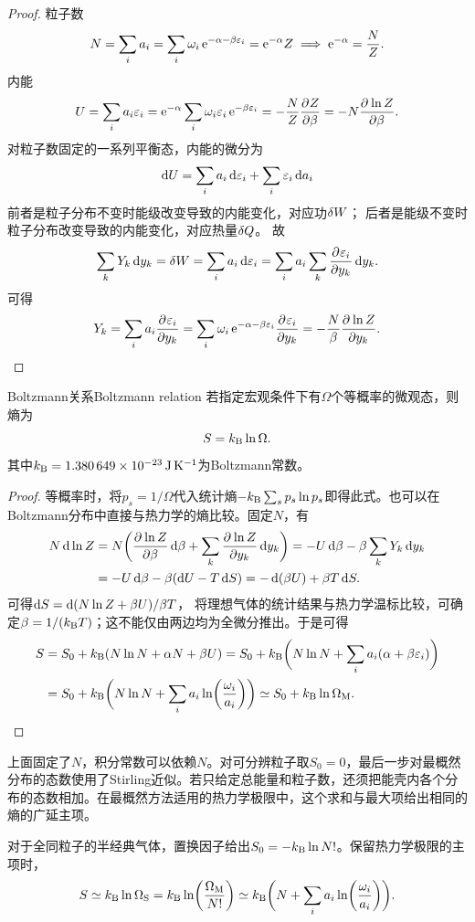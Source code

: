 \begin{proof}
	粒子数
	\[
		N = \sum_i a_i = \sum_i \omega_i\mathop{}\!\mathrm{e}^{-\alpha-\beta\varepsilon_i} = \mathop{}\!\mathrm{e}^{-\alpha}Z
		\implies \mathop{}\!\mathrm{e}^{-\alpha} = \frac NZ.
	\]
	内能
	\[
		U = \sum_i a_i\varepsilon_i = \mathop{}\!\mathrm{e}^{-\alpha}\sum_i \omega_i\varepsilon_i\mathop{}\!\mathrm{e}^{-\beta\varepsilon_i} = -\frac NZ\frac{\partial^{}Z}{\partial{\beta}^{}} = -N\frac{\partial^{}\ln Z}{\partial{\beta}^{}}.
	\]
	对粒子数固定的一系列平衡态，内能的微分为
	\[
		\mathop{}\!\mathrm{d} U = \sum_i a_i\mathop{}\!\mathrm{d}\varepsilon_i + \sum_i \varepsilon_i\mathop{}\!\mathrm{d} a_i
	\]
	前者是粒子分布不变时能级改变导致的内能变化，对应功$\mathop{}\!\delta W$；
	后者是能级不变时粒子分布改变导致的内能变化，对应热量$\mathop{}\!\delta Q$。
	故
	\[
		\sum_k Y_k\mathop{}\!\mathrm{d} y_k = \mathop{}\!\delta W = \sum_i a_i\mathop{}\!\mathrm{d}\varepsilon_i = \sum_i a_i\sum_k\frac{\partial^{}\varepsilon_i}{\partial{y_k}^{}}\mathop{}\!\mathrm{d} y_k.
	\]
	可得
	\[
		Y_k = \sum_i a_i\frac{\partial^{}\varepsilon_i}{\partial{y_k}^{}} = \sum_i \omega_i\mathop{}\!\mathrm{e}^{-\alpha-\beta\varepsilon_i}\frac{\partial^{}\varepsilon_i}{\partial{y_k}^{}} = -\frac N\beta\frac{\partial^{}\ln Z}{\partial{y_k}^{}}.
		\qedhere
	\]
\end{proof}

\begin{theorem}{Boltzmann关系}{Boltzmann relation}
	若指定宏观条件下有$\Omega$个等概率的微观态，则熵为
	\begin{equation}
		S = k_{\mathrm{B}}\ln\Omega.
	\end{equation}
	其中$k_{\mathrm{B}} = \qty{1.380649e-23}{\joule\per\kelvin}$为Boltzmann常数。
\end{theorem}

\begin{proof}
	等概率时，将$p_s = 1/\Omega$代入统计熵$\textstyle -k_{\mathrm{B}}\sum_s p_s\ln p_s$即得此式。也可以在Boltzmann分布中直接与热力学的熵比较。固定$N$，有
	\begin{align*}
		N\d\ln Z &= N\biggp{\pv{\ln Z}\beta\d\beta + \sum_k\pv{\ln Z}{y_k}\d y_k} = -U\d\beta - \beta\sum_k Y_k\d y_k\\
		&= -U\d\beta - \beta(\d U - T\d S) = -\d(\beta U) + \beta T\d S.
	\end{align*}
	可得$\mathop{}\!\mathrm{d} S = \mathop{}\!\mathrm{d}(N\ln Z + \beta U)/\beta T$，
	将理想气体的统计结果与热力学温标比较，可确定$\beta = 1/(k_{\mathrm{B}} T)$；这不能仅由两边均为全微分推出。于是可得
	\begin{align*}
		S &= S_0 + k_{\mathrm{B}}(N\ln N + \alpha N + \beta U)
		= S_0 + k_{\mathrm{B}}\biggl(N\ln N + \sum_i a_i(\alpha + \beta\varepsilon_i)\biggr)\\
		&= S_0 + k_{\mathrm{B}}\biggl(N\ln N + \sum_i a_i\ln\biggl(\frac{\omega_i}{a_i}\biggr)\biggr)
		\simeq S_0 + k_{\mathrm{B}}\ln\Omega_{\mathrm{M}}.
		\qedhere
	\end{align*}
\end{proof}

\begin{remark}
	上面固定了$N$，积分常数可以依赖$N$。对可分辨粒子取$S_0 = 0$，最后一步对最概然分布的态数使用了Stirling近似。若只给定总能量和粒子数，还须把能壳内各个分布的态数相加。在最概然方法适用的热力学极限中，这个求和与最大项给出相同的熵的广延主项。

	对于全同粒子的半经典气体，置换因子给出$S_0 = -k_{\mathrm{B}}\ln N!$。保留热力学极限的主项时，
	\[
		S \simeq k_{\mathrm{B}}\ln\Omega_{\mathrm{S}} = k_{\mathrm{B}}\ln\biggl(\frac{\Omega_{\mathrm{M}}}{N!}\biggr)
		\simeq k_{\mathrm{B}}\biggl(N + \sum_i a_i\ln\biggl(\frac{\omega_i}{a_i}\biggr)\biggr).
	\]
\end{remark}

